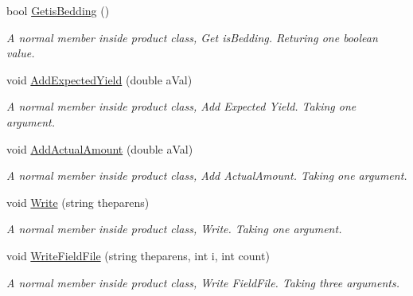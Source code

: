 \begin{DoxyCompactItemize}
bool \mbox{\hyperlink{class_global_vars_1_1product_ac9b39f54bc2474e81629a98b3cb0008b}{Getis\+Bedding}} ()
\begin{DoxyCompactList}\small\item\em A normal member inside product class, Get is\+Bedding. Returing one boolean value. \end{DoxyCompactList}\item 
void \mbox{\hyperlink{class_global_vars_1_1product_a8e8487be42a12272849cfcdfd0e87470}{Add\+Expected\+Yield}} (double a\+Val)
\begin{DoxyCompactList}\small\item\em A normal member inside product class, Add Expected Yield. Taking one argument. \end{DoxyCompactList}\item 
void \mbox{\hyperlink{class_global_vars_1_1product_ad0777eac2225214c7b3abd5f961e41ce}{Add\+Actual\+Amount}} (double a\+Val)
\begin{DoxyCompactList}\small\item\em A normal member inside product class, Add Actual\+Amount. Taking one argument. \end{DoxyCompactList}\item 
void \mbox{\hyperlink{class_global_vars_1_1product_a5d04c99bd5f354667c9158942c3e0019}{Write}} (string theparens)
\begin{DoxyCompactList}\small\item\em A normal member inside product class, Write. Taking one argument. \end{DoxyCompactList}\item 
void \mbox{\hyperlink{class_global_vars_1_1product_a251b65f82d40438bd78bc7fdb8536e8b}{Write\+Field\+File}} (string theparens, int i, int count)
\begin{DoxyCompactList}\small\item\em A normal member inside product class, Write Field\+File. Taking three arguments. \end{DoxyCompactList}\end{DoxyCompactItemize}
